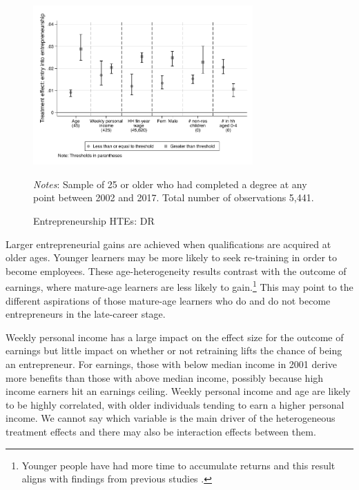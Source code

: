 \documentclass[12pt, a4paper]{article}
\begin{document}
\begin{figure}[htbp]
\centering
\caption{Entrepreneurship HTEs: DR}
\vspace{0.5cm}
  \label{fig:htedrent}
    \includegraphics[width=0.75\textwidth]{_figures/hte_entrepreneur_G_100_DR.pdf}
\parbox{1\textwidth}{\footnotesize{\textit{Notes}: Sample of 25 or older who had completed a degree at any point between 2002 and 2017. Total number of observations 5,441.}}
\end{figure}
\doublespacing

Larger entrepreneurial gains are achieved when qualifications are acquired at
older ages. Younger learners may be more likely to seek re-training in order to become employees. These age-heterogeneity results contrast with the outcome of earnings, where mature-age learners are less likely to gain.\footnote{Younger people have had more time to accumulate returns and this result aligns with findings from previous studies \citep{polidano2016,dorsett2016,perales2017}.} This may point to the different aspirations of those mature-age learners who do and do not become entrepreneurs in the late-career stage.  

Weekly personal income has a large impact on the effect size for the outcome of earnings but little impact on whether or not retraining lifts the chance of being an entrepreneur. For earnings, those with below median income in 2001 derive more benefits than those with above median income, possibly because high income earners hit an earnings ceiling. Weekly personal income and age are likely to be highly correlated, with older individuals tending to earn a higher personal income. We cannot say which variable is the main driver of the
heterogeneous treatment effects and there may also be interaction effects between them.
\end{document}
